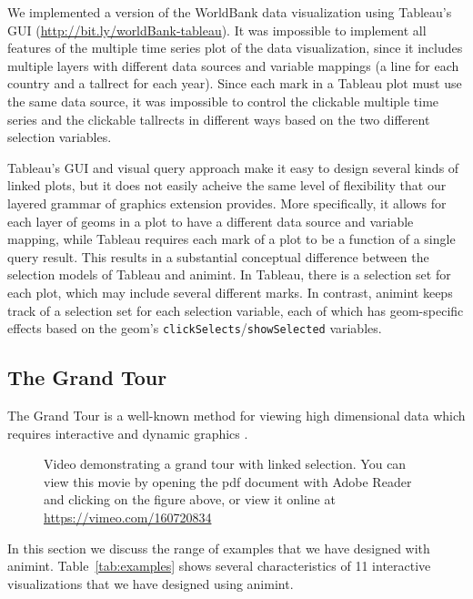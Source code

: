 \documentclass[journal]{vgtc}\usepackage[]{graphicx}\usepackage[]{color}
\begin{document}
We implemented a version of the WorldBank data visualization using
Tableau's GUI (\url{http://bit.ly/worldBank-tableau}).
It was impossible to implement all features of the multiple time
series plot of the data visualization, since it includes multiple
layers with different data sources and variable mappings (a line for
each country and a tallrect for each year). Since each mark in a
Tableau plot must use the same data source, it was impossible to
control the clickable multiple time series and the clickable tallrects
in different ways based on the two different selection variables.

Tableau's GUI and visual query approach
make it easy to design several kinds of linked plots, but it does not
easily acheive the same level of flexibility that our
layered grammar of graphics extension provides. More specifically, it allows
for each layer of geoms in a plot to have a different data source and
variable mapping, while Tableau requires each mark of a plot to be a
function of a single query result. This results in a substantial
conceptual difference between the selection models of Tableau and animint. In Tableau, there is a selection set for each plot, which may
include several different marks. In contrast, animint keeps track of a
selection set for each selection variable, each of which has
geom-specific effects based on the geom's \texttt{clickSelects}/\texttt{showSelected}
variables.

\subsection{The Grand Tour}

The Grand Tour is a well-known method for viewing high dimensional data which requires interactive and dynamic graphics \citep{grand-tour}.

\begin{figure}[htp]
	\centerline{}
	\label{fig:tour}
	\caption{Video demonstrating a grand tour with linked selection. You can view this movie by opening the pdf document with Adobe Reader and clicking on the figure above, or view it online at \url{https://vimeo.com/160720834}}
\end{figure}


In this section we discuss the range of examples that we have designed
with animint. Table~\ref{tab:examples} shows several characteristics
of 11 interactive visualizations that we have designed using
animint.
\end{document}
